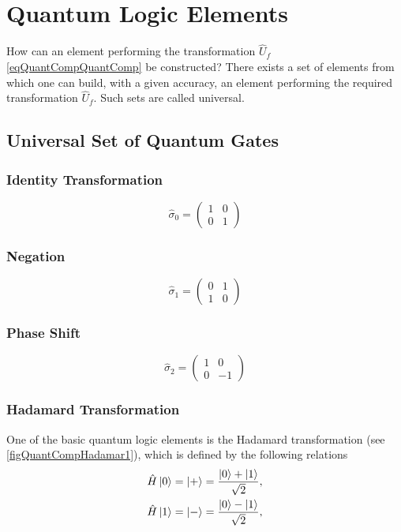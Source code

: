 \section{Quantum Logic Elements}
How can an element performing the transformation $\hat{U}_f$ \eqref{eqQuantCompQuantComp} be constructed? There exists a set of elements from which one can build, with a given accuracy, an element performing the required transformation $\hat{U}_f$. Such sets are called universal.

\subsection{Universal Set of Quantum Gates}

\subsubsection{Identity Transformation}

\[
\hat{\sigma}_0 = \begin{pmatrix}
1 & 0 \\
0 & 1
\end{pmatrix}
\]

\subsubsection{Negation}

\[
\hat{\sigma}_1 = \begin{pmatrix}
0 & 1 \\
1 & 0
\end{pmatrix}
\]

\subsubsection{Phase Shift}

\[
\hat{\sigma}_2 = \begin{pmatrix}
1 & 0 \\
0 & -1
\end{pmatrix}
\]

\subsubsection{Hadamard Transformation}
One of the basic quantum logic elements is the Hadamard transformation (see \autoref{figQuantCompHadamar1}), which is defined by the following relations
\begin{eqnarray}
\hat{H} \ket{0} = \ket{+} =  
\frac{\ket{0} + \ket{1} }{\sqrt{2}},
\nonumber \\
\hat{H} \ket{1} = \ket{-} = 
\frac{\ket{0} - \ket{1} }{\sqrt{2}},
\nonumber
\end{eqnarray}

